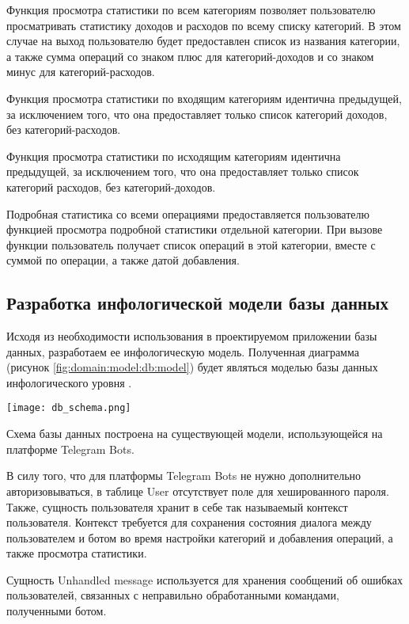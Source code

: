 Функция просмотра статистики по всем категориям позволяет пользователю просматривать статистику доходов и расходов по всему списку категорий. В этом случае на выход пользователю будет предоставлен список из названия категории, а также сумма операций со знаком плюс для категорий-доходов и со знаком минус для категорий-расходов.

Функция просмотра статистики по входящим категориям идентична предыдущей, за исключением того, что она предоставляет только список категорий доходов, без категорий-расходов.

Функция просмотра статистики по исходящим категориям идентична предыдущей, за исключением того, что она предоставляет только список категорий расходов, без категорий-доходов.

Подробная статистика со всеми операциями предоставляется пользователю функцией просмотра подробной статистики отдельной категории. При вызове функции пользователь получает список операций в этой категории, вместе с суммой по операции, а также датой добавления.

\subsection{Разработка инфологической модели базы данных}
\label{sec:domain:model:db}

Исходя из необходимости использования в проектируемом приложении базы данных, разработаем ее инфологическую модель. Полученная диаграмма (рисунок \ref{fig:domain:model:db:model}) будет являться моделью базы данных инфологического уровня \cite{kulikov_db_workbook}.

\begin{sidewaysfigure}
\centering
	\texttt{[image: db\_schema.png]}
	\caption{Инфологическая модель базы данных}
	\label{fig:domain:model:db:model}
\end{sidewaysfigure}

Схема базы данных построена на существующей модели, использующейся на платформе Telegram Bots.

В силу того, что для платформы Telegram Bots не нужно дополнительно авторизовываться, в таблице User отсутствует поле для хешированного пароля. Также, сущность пользователя хранит в себе так называемый контекст пользователя. Контекст требуется для сохранения состояния диалога между пользователем и ботом во время настройки категорий и добавления операций, а также просмотра статистики.

Сущность Unhandled message используется для хранения сообщений об ошибках пользователей, связанных с неправильно обработанными командами, полученными ботом.


